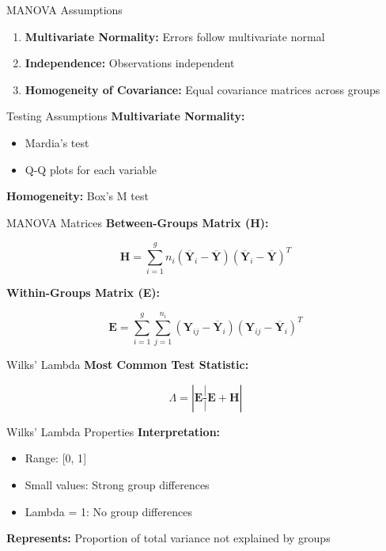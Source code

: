 \documentclass[aspectratio=169,ignorenonframetext]{beamer}
\begin{document}
\begin{frame}{MANOVA Assumptions}
\begin{enumerate}
\item
  \textbf{Multivariate Normality:} Errors follow multivariate normal
\item
  \textbf{Independence:} Observations independent
\item
  \textbf{Homogeneity of Covariance:} Equal covariance matrices across
  groups
\end{enumerate}
\end{frame}

\begin{frame}{Testing Assumptions}
\textbf{Multivariate Normality:}

\begin{itemize}
\item
  Mardia's test
\item
  Q-Q plots for each variable
\end{itemize}

\textbf{Homogeneity:} Box's M test
\end{frame}

\begin{frame}{MANOVA Matrices}
\textbf{Between-Groups Matrix (H):}

\[\mathbf{H} = \sum_{i = 1}^{g}n_{i}\left( {\overline{\mathbf{Y}}}_{i} - \overline{\mathbf{Y}} \right)\left( {\overline{\mathbf{Y}}}_{i} - \overline{\mathbf{Y}} \right)^{T}\]

\textbf{Within-Groups Matrix (E):}

\[\mathbf{E} = \sum_{i = 1}^{g}\sum_{j = 1}^{n_{i}}\left( \mathbf{Y}_{ij} - {\overline{\mathbf{Y}}}_{i} \right)\left( \mathbf{Y}_{ij} - {\overline{\mathbf{Y}}}_{i} \right)^{T}\]
\end{frame}

\begin{frame}{Wilks' Lambda}
\textbf{Most Common Test Statistic:}

\[\Lambda = |\mathbf{E}\frac{|}{|}\mathbf{E} + \mathbf{H}|\]
\end{frame}

\begin{frame}{Wilks' Lambda Properties}
\textbf{Interpretation:}

\begin{itemize}
\item
  Range: {[}0, 1{]}
\item
  Small values: Strong group differences
\item
  Lambda = 1: No group differences
\end{itemize}

\textbf{Represents:} Proportion of total variance not explained by
groups
\end{frame}
\end{document}
